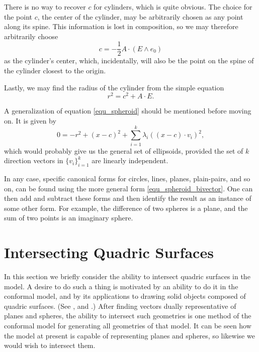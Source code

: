 \documentclass{birkjour}
\theoremstyle{definition}
\theoremstyle{remark}
\numberwithin{equation}{section}
\begin{document}
There is no way to recover $c$ for cylinders, which is quite obvious.
The choice for the point $c$, the center of the cylinder, may be arbitrarily
chosen as any point along its spine.  This information is lost in composition,
so we may therefore arbitrarily choose
\begin{equation}
c=-\frac{1}{2}A\cdot(E\wedge e_0)
\end{equation}
as the cylinder's center, which, incidentally, will also be the point on the spine of
the cylinder closest to the origin.

Lastly, we may find the radius of the cylinder from the simple equation
\begin{equation}
r^2 = c^2 + A\cdot E.
\end{equation}

A generalization of equation \eqref{equ_spheroid} should be mentioned
before moving on.  It is given by
\begin{equation}
0 = -r^2 + (x-c)^2 + \sum_{i=1}^k \lambda_i((x-c)\cdot v_i)^2,
\end{equation}
which would probably give us the general set of ellipsoids, provided
the set of $k$ direction vectors in $\{v_i\}_{i=1}^k$ are
linearly independent.

In any case, specific canonical forms for circles, lines, planes, plain-pairs,
and so on, can be found using the more general form \eqref{equ_spheroid_bivector}.  One can
then add and subtract these forms and then identify the result as an
instance of some other form.  For example, the difference of two
spheres is a plane, and the sum of two points is an imaginary sphere.

\section{Intersecting Quadric Surfaces}\label{sec_quadric_intersections}



In this section we briefly consider the ability to intersect quadric surfaces in the model.
A desire to do such a thing is motivated by an ability to do it in the conformal model,
and by its applications to drawing solid objects composed of quadric surfaces.  (See \cite{Levin76}, \cite{WangGoldmanTu03}
and \cite{Miller87}.)  After finding vectors dually representative of planes and spheres,
the ability to intersect such geometries is one method of the conformal model for generating
all geometries of that model.  It can be seen how the model at present is capable of representing
planes and spheres, so likewise we would wish to intersect them.
\end{document}
